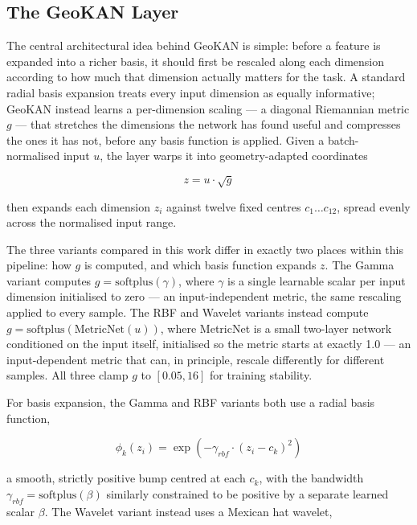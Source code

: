 \documentclass[sn-mathphys,Numbered]{sn-jnl}
\begin{document}
\FloatBarrier
\subsection{The GeoKAN Layer}\label{subsec4-5}

The central architectural idea behind GeoKAN \cite{sen2026geokan} is simple: before a feature is expanded into a richer basis, it should first be rescaled along each dimension according to how much that dimension actually matters for the task. A standard radial basis expansion treats every input dimension as equally informative; GeoKAN instead learns a per-dimension scaling --- a diagonal Riemannian metric $g$ --- that stretches the dimensions the network has found useful and compresses the ones it has not, before any basis function is applied. Given a batch-normalised input $u$, the layer warps it into geometry-adapted coordinates

\begin{equation}
z = u \cdot \sqrt{g}
\label{eq:warp}
\end{equation}

then expands each dimension $z_i$ against twelve fixed centres $c_1 \ldots c_{12}$, spread evenly across the normalised input range.

The three variants compared in this work differ in exactly two places within this pipeline: how $g$ is computed, and which basis function expands $z$. The Gamma variant computes $g = \text{softplus}(\gamma)$, where $\gamma$ is a single learnable scalar per input dimension initialised to zero --- an input-independent metric, the same rescaling applied to every sample. The RBF and Wavelet variants instead compute $g = \text{softplus}(\text{MetricNet}(u))$, where MetricNet is a small two-layer network conditioned on the input itself, initialised so the metric starts at exactly 1.0 --- an input-dependent metric that can, in principle, rescale differently for different samples. All three clamp $g$ to $[0.05, 16]$ for training stability.

For basis expansion, the Gamma and RBF variants both use a radial basis function,

\begin{equation}
\phi_k(z_i) = \exp\left(-\gamma_{rbf} \cdot (z_i - c_k)^2\right)
\label{eq:rbf}
\end{equation}

a smooth, strictly positive bump centred at each $c_k$, with the bandwidth $\gamma_{rbf} = \text{softplus}(\beta)$ similarly constrained to be positive by a separate learned scalar $\beta$. The Wavelet variant instead uses a Mexican hat wavelet,
\end{document}
